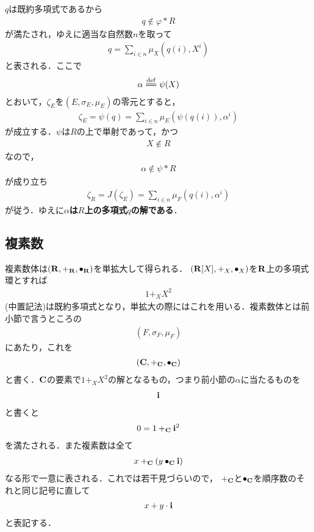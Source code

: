 	$q$は既約多項式であるから
	\begin{align}
		q \notin \varphi \ast R
	\end{align}
	が満たされ，ゆえに適当な自然数$n$を取って
	\begin{align}
		q = \sum_{i \in n} \mu_X \left(q(i),X^i\right)
	\end{align}
	と表される．ここで
	\begin{align}
		\alpha \defeq \psi(X)
	\end{align}
	とおいて，$\zeta_E$を$(E,\sigma_E,\mu_E)$の零元とすると，
	\begin{align}
		\zeta_E = \psi(q)
		= \sum_{i \in n} \mu_E \left(\psi(q(i)),\alpha^i\right)
	\end{align}
	が成立する．$\psi$は$R$の上で単射であって，かつ
	\begin{align}
		X \notin R
	\end{align}
	なので，
	\begin{align}
		\alpha \notin \psi \ast R
	\end{align}
	が成り立ち
	\begin{align}
		\zeta_R = J(\zeta_E)
		= \sum_{i \in n} \mu_F \left(q(i),\alpha^i\right)
	\end{align}
	が従う．ゆえに{\bf $\alpha$は$R$上の多項式$q$の解である}．
	
	
\subsection{複素数}
	複素数体は$(\mathbf{R},+_{\mathbf{R}},\bullet_{\mathbf{R}})$を単拡大して得られる．
	$(\mathbf{R}[X],+_X,\bullet_X)$を$\mathbf{R}$上の多項式環とすれば
	\begin{align}
		1 +_X X^2
	\end{align}
	(中置記法)は既約多項式となり，単拡大の際にはこれを用いる．複素数体とは前小節で言うところの
	\begin{align}
		(F,\sigma_F,\mu_F)
	\end{align}
	にあたり，これを
	\begin{align}
		(\mathbf{C},+_{\mathbf{C}},\bullet_{\mathbf{C}})
	\end{align}
	と書く．$\mathbf{C}$の要素で$1 +_X X^2$の解となるもの，つまり前小節の$\alpha$に当たるものを
	\begin{align}
		\mathbf{i}
	\end{align}
	と書くと
	\begin{align}
		0 = 1 +_{\mathbf{C}} \mathbf{i}^2
	\end{align}
	を満たされる．また複素数は全て
	\begin{align}
		x +_{\mathbf{C}} (y \bullet_{\mathbf{C}} \mathbf{i})
	\end{align}
	なる形で一意に表される．これでは若干見づらいので，
	$+_{\mathbf{C}}$と$\bullet_{\mathbf{C}}$を順序数のそれと同じ記号に直して
	\begin{align}
		x + y \cdot \mathbf{i}
	\end{align}
	と表記する．

\newpage